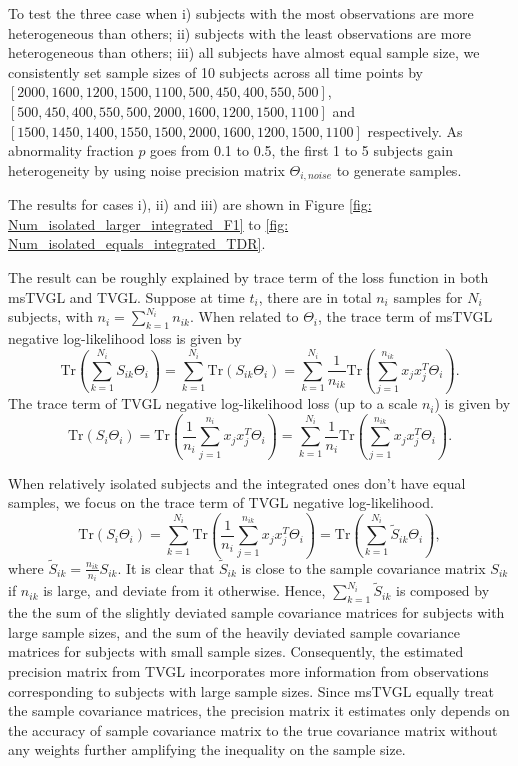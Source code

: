 To test the three case when i) subjects with the most observations are more heterogeneous than others; 
ii) subjects with the least observations are more heterogeneous than others; 
iii) all subjects have almost equal sample size,
we consistently set sample sizes of 10 subjects across all time points by $[2000, 1600, 1200, 1500, 1100, 500, 450, 400, 550, 500]$, 
$[500, 450, 400, 550, 500, 2000, 1600, 1200, 1500, 1100]$ and $[1500, 1450, 1400, 1550, 1500, 2000, 1600, 1200, 1500, 1100]$ 
respectively. 
As abnormality fraction $p$ goes from 0.1 to 0.5, 
the first 1 to 5 subjects gain heterogeneity by using noise precision matrix $\Theta_{i,noise}$ 
to generate samples. 

The results for cases i), ii) and iii) are shown in Figure \ref{fig: Num_isolated_larger_integrated_F1}
to \ref{fig: Num_isolated_equals_integrated_TDR}.

The result can be roughly explained by trace term of the loss function in both msTVGL and TVGL. 
Suppose at time $t_i$, there are in total $n_i$ samples for $N_i$ subjects, 
with $n_i=\sum_{k=1}^{N_i}n_{ik}$. 
When related to $\Theta_i$, 
the trace term of msTVGL negative log-likelihood loss is given by 
\begin{equation*}
    \text{Tr}(\sum_{k=1}^{N_i}S_{ik}\Theta_i) = \sum_{k=1}^{N_i}\text{Tr}(S_{ik}\Theta_i) 
    = \sum_{k=1}^{N_i}\frac{1}{n_{ik}}\text{Tr}(\sum_{j=1}^{n_{ik}}x_jx_j^T\Theta_i). 
\end{equation*}
The trace term of TVGL negative log-likelihood loss (up to a scale $n_i$) is given by 
\begin{equation*}
    \text{Tr}(S_i\Theta_i) = \text{Tr}(\frac{1}{n_i}\sum_{j=1}^{n_i}x_jx_j^T\Theta_i)
    = \sum_{k=1}^{N_i}\frac{1}{n_i}\text{Tr}(\sum_{j=1}^{n_{ik}}x_jx_j^T\Theta_i). 
\end{equation*}

When relatively isolated subjects and the integrated ones don't have equal samples, 
we focus on the trace term of TVGL negative log-likelihood. 
\begin{equation*}
    \text{Tr}(S_i\Theta_i) = \sum_{k=1}^{N_i}\text{Tr}(\frac{1}{n_i}\sum_{j=1}^{n_{ik}}x_jx_j^T\Theta_i) 
    = \text{Tr}(\sum_{k=1}^{N_i}\tilde{S}_{ik}\Theta_i), 
\end{equation*}
where $\tilde{S}_{ik}=\frac{n_{ik}}{n_i}S_{ik}$. 
It is clear that $\tilde{S}_{ik}$ is close to the sample covariance matrix $S_{ik}$ if $n_{ik}$ is large, 
and deviate from it otherwise. 
Hence, $\sum_{k=1}^{N_i}\tilde{S}_{ik}$ is composed by the the sum of the slightly deviated sample covariance matrices for subjects with large sample sizes, 
and the sum of the heavily deviated sample covariance matrices for subjects with small sample sizes. 
Consequently, the estimated precision matrix from TVGL incorporates more information from observations corresponding to subjects with large sample sizes.
Since msTVGL equally treat the sample covariance matrices, 
the precision matrix it estimates only depends on the accuracy of sample covariance matrix to the true covariance matrix 
without any weights further amplifying the inequality on the sample size.

